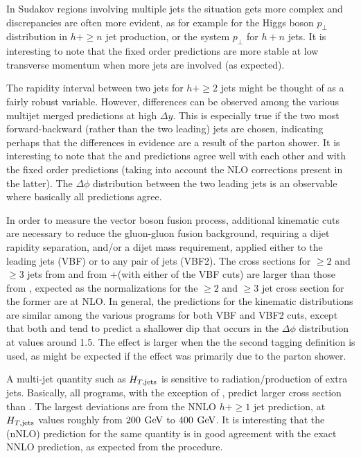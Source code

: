 In Sudakov regions involving multiple jets the situation gets more complex
and discrepancies are often more evident, as for example for the 
Higgs boson $p_\perp$ distribution in $h+\ge n$ jet production, or the 
system $p_\perp$ for $h+n$ jets. It is interesting to note that the fixed 
order predictions are more stable at low transverse momentum when more 
jets are involved (as expected). 

The rapidity interval between two jets for $h+\ge2$ jets might be thought 
of as a fairly robust variable. However, differences can be observed among 
the various multijet merged predictions at high $\Delta y$. This is especially true 
if the two most forward-backward (rather than the two leading) jets are 
chosen, indicating perhaps that the differences in evidence are a result 
of the parton shower. It is interesting to note that the \Powheg \NNLOPS 
and \Sherpa \NNLOPS predictions agree well with each other and with the 
fixed order predictions (taking into account the NLO corrections present 
in the latter). The $\Delta \phi$ distribution between the two leading 
jets is an observable where basically all predictions agree. 

In order to measure the vector boson fusion process, additional kinematic 
cuts are necessary to reduce the gluon-gluon fusion background, requiring 
a dijet rapidity separation, and/or a dijet mass requirement, applied 
either to the leading jets (VBF) or to any pair of 
jets (VBF2). The cross sections for $\ge2$ and $\ge3$ jets from \Sherpa 
\MEPSatNLO and from \GoSam{}+\Sherpa (with either of the VBF cuts) are larger than 
those from \Powheg \NNLOPS, expected as the normalizations for the $\ge2$ 
and $\ge3$ jet cross section for the former are at NLO. In general, the 
predictions for the kinematic distributions are similar among the various 
programs for both VBF and VBF2 cuts, except that both \Sherpa \MEPSatNLO and 
\Sherpa \NNLOPS tend to predict a shallower dip that occurs in the $\Delta \phi$ 
distribution at values around 1.5. The effect is larger when the 
the second tagging definition is used, as might be expected if the effect was 
primarily due to the parton shower. 

A multi-jet quantity such as $H_{T, {\rm jets}}$ is sensitive to 
radiation/production of extra jets. Basically, all programs, with the 
exception of \Herwig, predict larger cross section than \Powheg \NNLOPS. 
The largest deviations are from the NNLO  $h+\ge1$ jet prediction, at 
$H_{T, {\rm jets}}$ values roughly from $200\,\text{\:GeV}$ to $400\,\text{\:GeV}$. 
It is interesting that the \Loopsim (nNLO) prediction for the same quantity 
is in good agreement with the exact NNLO prediction, as expected from the 
\Loopsim procedure.

